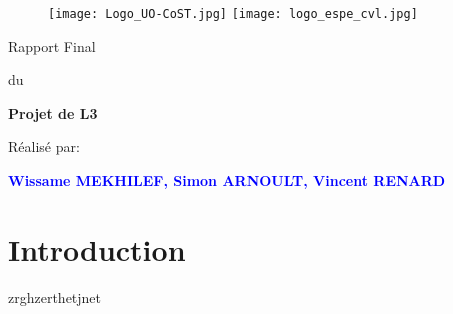 \documentclass[french,12pt]{article}
\begin{document}
\thispagestyle{empty}
%
\begin{figure}[H]
\texttt{[image: Logo\_UO-CoST.jpg]}
\hfill
\texttt{[image: logo\_espe\_cvl.jpg]}
\end{figure}
\vspace{2cm}
%
\begin{center}
{\Huge Rapport Final}
\par\vspace{0.4cm}
{\Large du}
\par\vspace{0.4cm}
{\Huge\bf Projet de L3}
\par\vspace{1.6cm}
{\Huge       Réalisé par:}
\par\vspace{0.3cm}
{\Huge\bf \textcolor{blue}{Wissame MEKHILEF, Simon ARNOULT, Vincent RENARD}}
\end{center}
\newpage
\tableofcontents
\newpage


\section{Introduction}

zrghzerthetjnet
\end{document}
